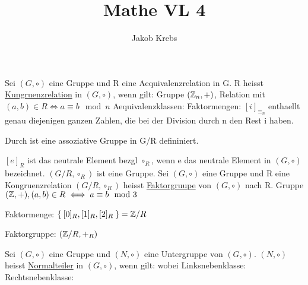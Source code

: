\documentclass{../tudscript}
\author{Jakob Krebs}
\title{Mathe VL 4}
\begin{document}
Sei $(G, \circ )$ eine Gruppe und R eine Aequivalenzrelation in G. R heisst \underline{Kungruenzrelation}
in $(G, \circ )$, wenn gilt:
Gruppe $(\mathbb{Z}_n, +)$, Relation mit $(a,b) \in R \iff a \equiv b \mod n$
Aequivalenzklassen:
Faktormengen:
$[i]_{\equiv_n}$ enthaellt genau diejenigen ganzen Zahlen, die bei der Division durch n den Rest i haben.

Durch
ist eine assoziative Gruppe in G/R defininiert.


$[e]_R$ ist das neutrale Element bezgl $\circ_R$, wenn e das neutrale Element in $(G, \circ)$ bezeichnet.
$(G/R, \circ_R)$ ist eine Gruppe.
Sei $(G, \circ )$ eine Gruppe und R eine Kongruenzrelation $(G/R, \circ_R)$ heisst \underline{Faktorgruupe} von $(G, \circ)$ nach R.
Gruppe $(\mathbb{Z}, +), (a,b) \in R \iff a \equiv b \mod 3$

Faktormenge: $\Set{[0]_R, [1]_R, [2]_R} = \mathbb{Z}/R$

Faktorgruppe: $(\mathbb{Z}/R, +_R)$

Sei $(G, \circ)$ eine Gruppe und $(N, \circ)$ eine Untergruppe von $(G, \circ)$. $(N, \circ)$ heisst \underline{Normalteiler} in $(G, \circ)$, wenn gilt:
wobei
Linksnebenklasse:
Rechtsnebenklasse:

\end{document}
